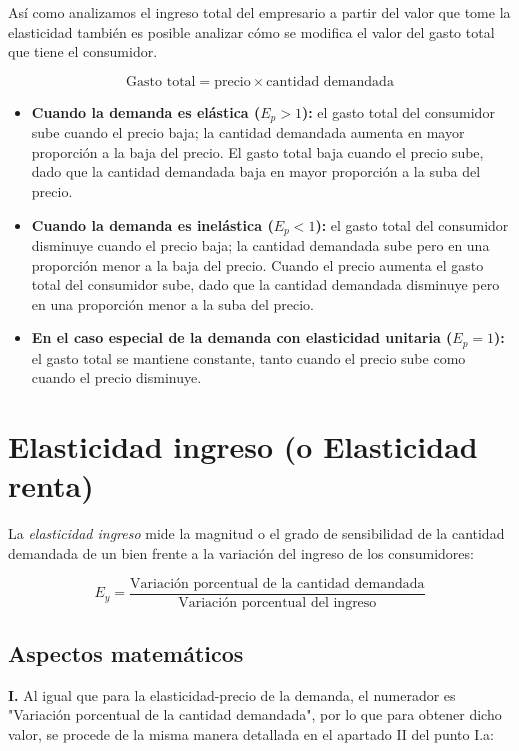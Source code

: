 \documentclass[12pt,a4paper]{article}
\begin{document}
Así como analizamos el ingreso total del empresario a partir del valor que tome la elasticidad también es posible analizar cómo se modifica el valor del gasto total que tiene el consumidor.

\[
\text{Gasto total} = \text{precio} \times \text{cantidad demandada}
\]

\begin{itemize}
\item \textbf{Cuando la demanda es elástica ($E_p > 1$):} el gasto total del consumidor sube cuando el precio baja; la cantidad demandada aumenta en mayor proporción a la baja del precio. El gasto total baja cuando el precio sube, dado que la cantidad demandada baja en mayor proporción a la suba del precio.

\item \textbf{Cuando la demanda es inelástica ($E_p < 1$):} el gasto total del consumidor disminuye cuando el precio baja; la cantidad demandada sube pero en una proporción menor a la baja del precio. Cuando el precio aumenta el gasto total del consumidor sube, dado que la cantidad demandada disminuye pero en una proporción menor a la suba del precio.

\item \textbf{En el caso especial de la demanda con elasticidad unitaria ($E_p = 1$):} el gasto total se mantiene constante, tanto cuando el precio sube como cuando el precio disminuye.
\end{itemize}

\section{Elasticidad ingreso (o Elasticidad renta)}

La \textit{elasticidad ingreso} mide la magnitud o el grado de sensibilidad de la cantidad demandada de un bien frente a la variación del ingreso de los consumidores:

\[
E_y = \frac{\text{Variación porcentual de la cantidad demandada}}{\text{Variación porcentual del ingreso}}
\]

\subsection{Aspectos matemáticos}

\textbf{I.} Al igual que para la elasticidad-precio de la demanda, el numerador es "Variación porcentual de la cantidad demandada", por lo que para obtener dicho valor, se procede de la misma manera detallada en el apartado II del punto I.a:
\end{document}

